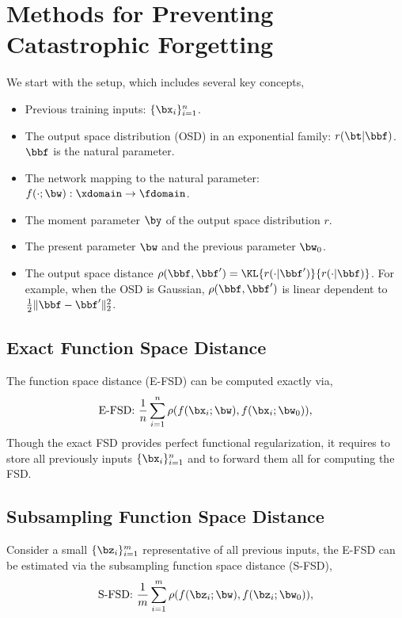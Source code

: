 \section{Methods for Preventing Catastrophic Forgetting}

We start with the setup, which includes several key concepts,
\begin{itemize}
    \item Previous training inputs: $\{\bx_i\}_{i=1}^n$.
    \item The output space distribution (OSD) in an exponential family: $r(\bt | \bbf)$. $\bbf$ is the natural parameter.
    \item The network mapping to the natural parameter: $f(\cdot; \bw): \xdomain \to \fdomain$.
    \item The moment parameter $\by$ of the output space distribution $r$.
    \item The present parameter $\bw$ and the previous parameter $\bw_0$.
    \item The output space distance $\rho(\bbf, \bbf') = \KL{r(\cdot|\bbf')}{r(\cdot|\bbf)}$. For example, when the OSD is Gaussian, $\rho(\bbf, \bbf')$ is linear dependent to $\frac{1}{2}\|\bbf - \bbf'\|_2^2$.
\end{itemize}

\subsection{Exact Function Space Distance}
The function space distance (E-FSD) can be computed exactly via,
\begin{align}
   \text{E-FSD: } \frac{1}{n}\sum_{i=1}^n \rho(f(\bx_i; \bw), f(\bx_i; \bw_0)),
\end{align}
Though the exact FSD provides perfect functional regularization, it requires to store all previously inputs $\{\bx_i\}_{i=1}^n$ and to forward them all for computing the FSD.

\subsection{Subsampling Function Space Distance}
Consider a small $\{\bz_i\}_{i=1}^m$ representative of all previous inputs, the E-FSD can be estimated via the subsampling function space distance (S-FSD),
\begin{align}
   \text{S-FSD: } \frac{1}{m}\sum_{i=1}^m \rho(f(\bz_i; \bw), f(\bz_i; \bw_0)),
\end{align}

